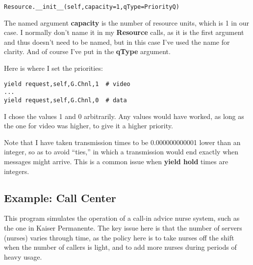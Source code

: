 \documentclass[11pt]{article}
\begin{document}
\begin{Verbatim}[fontsize=\relsize{-2}]
Resource.__init__(self,capacity=1,qType=PriorityQ)
\end{Verbatim}

The named argument {\bf capacity} is the number of resource units, which
is 1 in our case.  I normally don't name it in my {\bf Resource} calls,
as it is the first argument and thus doesn't need to be named, but in
this case I've used the name for clarity.  And of course I've put in the
{\bf qType} argument.

Here is where I set the priorities:

\begin{Verbatim}[fontsize=\relsize{-2}]
yield request,self,G.Chnl,1  # video
...
yield request,self,G.Chnl,0  # data
\end{Verbatim}

I chose the values 1 and 0 arbitrarily.  Any values would have worked,
as long as the one for video was higher, to give it a higher priority.

Note that I have taken transmission times to be 0.000000000001 lower
than an integer, so as to avoid ``ties,'' in which a transmission would
end exactly when messages might arrive.  This is a common issue when
{\bf yield hold} times are integers.

\subsection{Example:  Call Center}

This program simulates the operation of a call-in advice nurse system,
such as the one in Kaiser Permanente.  The key issue here is that the
number of servers (nurses) varies through time, as the policy here is to
take nurses off the shift when the number of callers is light, and to
add more nurses during periods of heavy usage.
\end{document}
